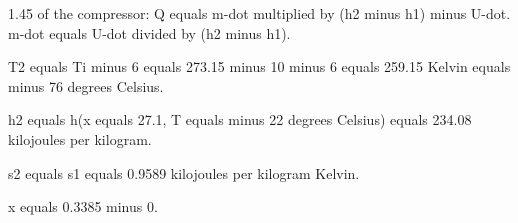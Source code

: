 1.45 of the compressor:  
Q equals m-dot multiplied by (h2 minus h1) minus U-dot.  
m-dot equals U-dot divided by (h2 minus h1).  

T2 equals Ti minus 6 equals 273.15 minus 10 minus 6 equals 259.15 Kelvin equals minus 76 degrees Celsius.  

h2 equals h(x equals 27.1, T equals minus 22 degrees Celsius) equals 234.08 kilojoules per kilogram.  

s2 equals s1 equals 0.9589 kilojoules per kilogram Kelvin.  

x equals 0.3385 minus 0.